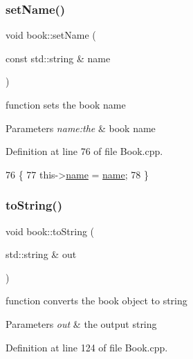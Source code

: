 \subsubsection{\texorpdfstring{set\+Name()}{setName()}}
{\footnotesize\ttfamily void book\+::set\+Name (\begin{DoxyParamCaption}\item[{const std\+::string \&}]{name }\end{DoxyParamCaption})}

function sets the book name 
\begin{DoxyParams}{Parameters}
{\em name\+:the} & book name \\
\hline
\end{DoxyParams}


Definition at line 76 of file Book.\+cpp.


\begin{DoxyCode}
76                                         \{
77     this->\hyperlink{classbook_a5eabc1c1c5abff26997bec3d41f90d9e}{name} = \hyperlink{classbook_a5eabc1c1c5abff26997bec3d41f90d9e}{name};
78 \}
\end{DoxyCode}
\mbox{\label{classbook_a458d26a8ddd01f69083a68eb68bf2181}} 
\subsubsection{\texorpdfstring{to\+String()}{toString()}}
{\footnotesize\ttfamily void book\+::to\+String (\begin{DoxyParamCaption}\item[{std\+::string \&}]{out }\end{DoxyParamCaption})}

function converts the book object to string 
\begin{DoxyParams}{Parameters}
{\em out} & the output string \\
\hline
\end{DoxyParams}


Definition at line 124 of file Book.\+cpp.


